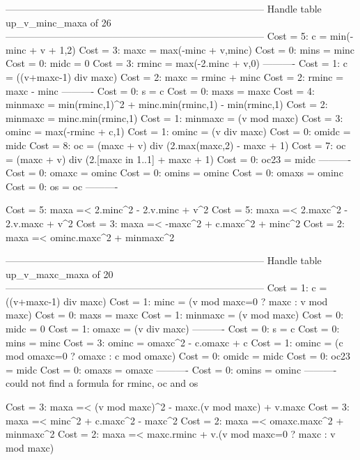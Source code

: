 --------------------------------------------------------------------------------
Handle table up_v_minc_maxa of 26
--------------------------------------------------------------------------------
Cost =  5:  c       = min(-minc + v + 1,2)
Cost =  3:  maxc    = max(-minc + v,minc)
Cost =  0:  mins    = minc
Cost =  0:  midc    = 0
Cost =  3:  rminc   = max(-2.minc + v,0)
----------
Cost =  1:  c       = ((v+maxc-1) div maxc)
Cost =  2:  maxc    = rminc + minc
Cost =  2:  rminc   = maxc - minc
----------
Cost =  0:  s       = c
Cost =  0:  maxs    = maxc
Cost =  4:  minmaxc = min(rminc,1)^2 + minc.min(rminc,1) - min(rminc,1)
Cost =  2:  minmaxc = minc.min(rminc,1)
Cost =  1:  minmaxc = (v mod maxc)
Cost =  3:  ominc   = max(-rminc + c,1)
Cost =  1:  ominc   = (v div maxc)
Cost =  0:  omidc   = midc
Cost =  8:  oc      = (maxc + v) div (2.max(maxc,2) - maxc + 1)
Cost =  7:  oc      = (maxc + v) div (2.[maxc in 1..1] + maxc + 1)
Cost =  0:  oc23    = midc
----------
Cost =  0:  omaxc   = ominc
Cost =  0:  omins   = ominc
Cost =  0:  omaxs   = ominc
Cost =  0:  os      = oc
----------

Cost =  5:  maxa =< 2.minc^2 - 2.v.minc + v^2
Cost =  5:  maxa =< 2.maxc^2 - 2.v.maxc + v^2
Cost =  3:  maxa =< -maxc^2 + c.maxc^2 + minc^2
Cost =  2:  maxa =< ominc.maxc^2 + minmaxc^2

--------------------------------------------------------------------------------
Handle table up_v_maxc_maxa of 20
--------------------------------------------------------------------------------
Cost =  1:  c       = ((v+maxc-1) div maxc)
Cost =  1:  minc    = (v mod maxc=0 ? maxc : v mod maxc)
Cost =  0:  maxs    = maxc
Cost =  1:  minmaxc = (v mod maxc)
Cost =  0:  midc    = 0
Cost =  1:  omaxc   = (v div maxc)
----------
Cost =  0:  s       = c
Cost =  0:  mins    = minc
Cost =  3:  ominc   = omaxc^2 - c.omaxc + c
Cost =  1:  ominc   = (c mod omaxc=0 ? omaxc : c mod omaxc)
Cost =  0:  omidc   = midc
Cost =  0:  oc23    = midc
Cost =  0:  omaxs   = omaxc
----------
Cost =  0:  omins   = ominc
----------
could not find a formula for rminc, oc and os

Cost =  3:  maxa =< (v mod maxc)^2 - maxc.(v mod maxc) + v.maxc
Cost =  3:  maxa =< minc^2 + c.maxc^2 - maxc^2
Cost =  2:  maxa =< omaxc.maxc^2 + minmaxc^2
Cost =  2:  maxa =< maxc.rminc + v.(v mod maxc=0 ? maxc : v mod maxc)

